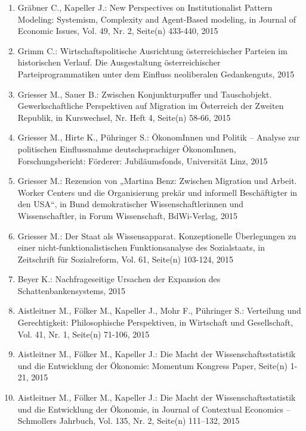 \begin{enumerate}
	 \item Gräbner C., Kapeller J.: New Perspectives on  Institutionalist Pattern Modeling: Systemism, Complexity and  Agent-Based modeling, in Journal of Economic Issues, Vol. 49, Nr. 2, Seite(n) 433-440, 2015
	 \item Grimm C.: Wirtschaftspolitische Ausrichtung österreichischer Parteien im historischen Verlauf. Die Ausgestaltung österreichischer Parteiprogrammatiken unter dem Einfluss neoliberalen Gedankenguts, 2015
	 \item Griesser M., Sauer B.: Zwischen Konjunkturpuffer und Tauschobjekt. Gewerkschaftliche Perspektiven auf Migration im Österreich der Zweiten Republik, in Kurswechsel, Nr. Heft 4, Seite(n) 58-66, 2015
	 \item Griesser M., Hirte K., Pühringer S.: ÖkonomInnen und Politik – Analyse zur politischen Einflussnahme deutschsprachiger ÖkonomInnen, Forschungsbericht: Förderer: Jubiläumsfonds, Universität Linz, 2015
	 \item Griesser M.: Rezension von „Martina Benz: Zwischen Migration und Arbeit. Worker Centers und die Organisierung prekär und informell Beschäftigter in den USA“, in Bund demokratischer Wissenschaftlerinnen und Wissenschaftler, in Forum Wissenschaft, BdWi-Verlag, 2015
	 \item Griesser M.: Der Staat als Wissensapparat. Konzeptionelle Überlegungen zu einer nicht-funktionalistischen Funktionsanalyse des Sozialstaats, in Zeitschrift für Sozialreform, Vol. 61, Seite(n) 103-124, 2015
	 \item Beyer K.: Nachfrageseitige Ursachen der Expansion des Schattenbankensystems, 2015
	 \item Aistleitner M., Fölker M., Kapeller J., Mohr F., Pühringer S.: Verteilung und Gerechtigkeit: Philosophische  Perspektiven, in Wirtschaft und Gesellschaft, Vol. 41, Nr. 1, Seite(n) 71-106, 2015
	 \item Aistleitner M., Fölker M., Kapeller J.: Die Macht der Wissenschaftsstatistik und die Entwicklung der Ökonomie: Momentum Kongress Paper, Seite(n) 1-21, 2015
	 \item Aistleitner M., Fölker M., Kapeller J.: Die Macht der Wissenschaftsstatistik und die Entwicklung der Ökonomie, in Journal of Contextual Economics – Schmollers Jahrbuch, Vol. 135, Nr. 2, Seite(n) 111–132, 2015
\end{enumerate}
